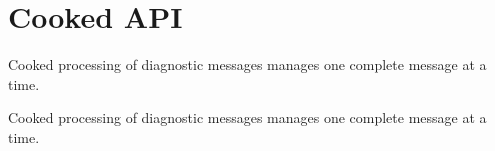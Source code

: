 \hypertarget{group__cooked__api__group}{}\section{Cooked A\+P\+I}
\label{group__cooked__api__group}


Cooked processing of diagnostic messages manages one complete message at a time.  


Cooked processing of diagnostic messages manages one complete message at a time. 

